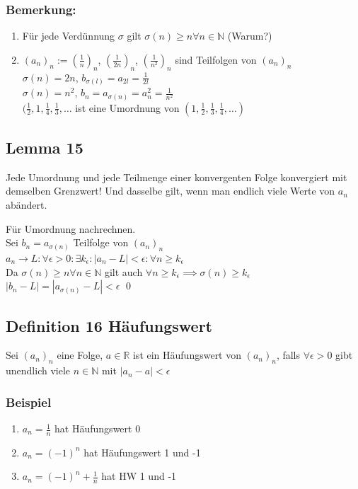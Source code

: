 \documentclass[fleqn]{scrbook}
\renewenvironment{proof}{{\bfseries Beweis }}{\qed}
\begin{document}
\subsubsection{Bemerkung:}
\begin{enumerate}[1)]
\item Für jede Verdünnung $\sigma$ gilt $\sigma (n) \geq n \forall n \in \mathbb{N}$ (Warum?)
\item $(a_n)_n := (\frac{1}{n})_n$, $(\frac{1}{2n})_n$, $(\frac{1}{n^2})_n$ sind Teilfolgen von $(a_n)_n$\\
$\sigma(n) = 2n$, $b_{\sigma(l)} = a_{2l} = \frac{1}{2l}$\\
$\sigma(n) = n^2$, $b_n = a_{\sigma(n)} = a_n^2 = \frac{1}{n^2}$\\
$(\frac{1}{2}, 1, \frac{1}{4}, \frac{1}{3}, \ldots$ ist eine Umordnung von $(1, \frac{1}{2}, \frac{1}{3}, \frac{1}{4}, \ldots)$
\end{enumerate}
\subsection{Lemma 15} Jede Umordnung und jede Teilmenge einer konvergenten Folge konvergiert mit demselben Grenzwert! Und dasselbe gilt, wenn man endlich viele Werte von $a_n$ abändert.

\begin{proof}
Für Umordnung nachrechnen.\\
Sei $b_n = a_{\sigma(n)}$ Teilfolge von $(a_n)_n$\\
$a_n \rightarrow L : \forall \epsilon > 0 : \exists k_\epsilon: |a_n - L| < \epsilon : \forall n \geq k_\epsilon$\\
Da $\sigma(n) \geq n \forall n \in \mathbb{N}$ gilt auch $\forall n \geq k_\epsilon \implies \sigma(n) \geq k_\epsilon $  \\
$|b_n - L| = |a_{\sigma(n)} - L| < \epsilon$
\end{proof}
\subsection{Definition 16 Häufungswert}
Sei $(a_n)_n$ eine Folge, $a\in\mathbb{R}$ ist ein Häufungswert von $(a_n)_n$, falls $\forall \epsilon > 0$ gibt unendlich viele $n\in\mathbb{N}$ mit $|a_n - a| < \epsilon$
\subsubsection{Beispiel} 
\begin{enumerate}
\item $a_n = \frac{1}{n}$ hat Häufungswert 0

\item $a_n = (-1)^n$ hat Häufungswert 1 und -1

\item $a_n = (-1)^n + \frac{1}{n}$ hat HW 1 und -1

\end{enumerate}
\end{document}
